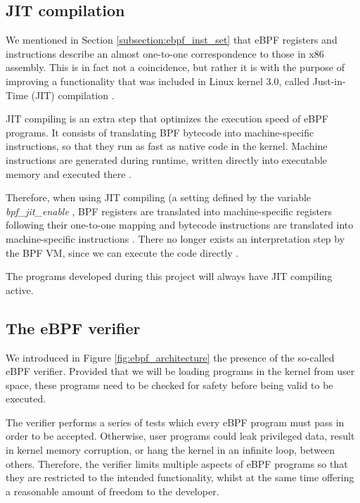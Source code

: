 \subsection{JIT compilation}
We mentioned in Section \ref{subsection:ebpf_inst_set} that eBPF registers and instructions describe an almost one-to-one correspondence to those in x86 assembly. This is in fact not a coincidence, but rather it is with the purpose of improving a functionality that was included in Linux kernel 3.0, called Just-in-Time (JIT) compilation \cite{ebpf_JIT} \cite{ebpf_JIT_demystify_page13}.

JIT compiling is an extra step that optimizes the execution speed of eBPF programs. It consists of translating BPF bytecode into machine-specific instructions, so that they run as fast as native code in the kernel. Machine instructions are generated during runtime, written directly into executable memory and executed there \cite{ebpf_JIT_demystify_page14}.

Therefore, when using JIT compiling (a setting defined by the variable \textit{bpf\_jit\_enable} \cite{jit_enable_setting}, BPF registers are translated into machine-specific registers following their one-to-one mapping and bytecode instructions are translated into machine-specific instructions \cite{ebpf_starovo_slides_page23}. There no longer exists an interpretation step by the BPF VM, since we can execute the code directly \cite{brendan_gregg_bpf_book_bpf_vm}.

The programs developed during this project will always have JIT compiling active.


\subsection{The eBPF verifier} \label{subsection:ebpf_verifier}
We introduced in Figure \ref{fig:ebpf_architecture} the presence of the so-called eBPF verifier. Provided that we will be loading programs in the kernel from user space, these programs need to be checked for safety before being valid to be executed.

The verifier performs a series of tests which every eBPF program must pass in order to be accepted. Otherwise, user programs could leak privileged data, result in kernel memory corruption, or hang the kernel in an infinite loop, between others. Therefore, the verifier limits multiple aspects of eBPF programs so that they are restricted to the intended functionality, whilst at the same time offering a reasonable amount of freedom to the developer.


